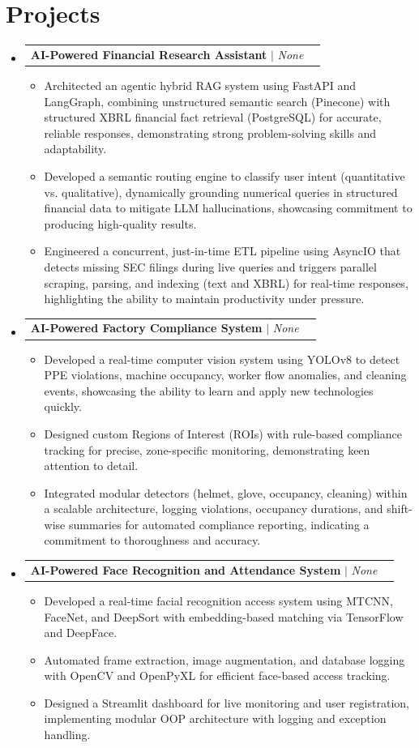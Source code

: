 \documentclass[letterpaper,11pt]{article}
\makeatletter
\newcommand{\resumeItem}[1]{
  \item\small{
    {#1 \vspace{-2pt}}
  }
}
\newcommand{\resumeProjectHeading}[2]{
    \item
    \begin{tabular*}{0.97\textwidth}{l@{\extracolsep{\fill}}r}
      \small#1 & #2 \\
    \end{tabular*}\vspace{-7pt}
}
\newcommand{\resumeSubHeadingListStart}{\begin{itemize}[leftmargin=0.15in, label={}]}
\newcommand{\resumeSubHeadingListEnd}{\end{itemize}}
\newcommand{\resumeItemListStart}{\begin{itemize}}
\newcommand{\resumeItemListEnd}{\end{itemize}\vspace{-5pt}}
\makeatother
\begin{document}
\section{Projects}
    \resumeSubHeadingListStart
            \resumeProjectHeading
          {\textbf{AI-Powered Financial Research Assistant} $|$ \emph{None}}{}
          \resumeItemListStart
                        \resumeItem{Architected an agentic hybrid RAG system using FastAPI and LangGraph, combining unstructured semantic search (Pinecone) with structured XBRL financial fact retrieval (PostgreSQL) for accurate, reliable responses, demonstrating strong problem-solving skills and adaptability.}
                        \resumeItem{Developed a semantic routing engine to classify user intent (quantitative vs. qualitative), dynamically grounding numerical queries in structured financial data to mitigate LLM hallucinations, showcasing commitment to producing high-quality results.}
                        \resumeItem{Engineered a concurrent, just-in-time ETL pipeline using AsyncIO that detects missing SEC filings during live queries and triggers parallel scraping, parsing, and indexing (text and XBRL) for real-time responses, highlighting the ability to maintain productivity under pressure.}
                      \resumeItemListEnd
            \resumeProjectHeading
          {\textbf{AI-Powered Factory Compliance System} $|$ \emph{None}}{}
          \resumeItemListStart
                        \resumeItem{Developed a real-time computer vision system using YOLOv8 to detect PPE violations, machine occupancy, worker flow anomalies, and cleaning events, showcasing the ability to learn and apply new technologies quickly.}
                        \resumeItem{Designed custom Regions of Interest (ROIs) with rule-based compliance tracking for precise, zone-specific monitoring, demonstrating keen attention to detail.}
                        \resumeItem{Integrated modular detectors (helmet, glove, occupancy, cleaning) within a scalable architecture, logging violations, occupancy durations, and shift-wise summaries for automated compliance reporting, indicating a commitment to thoroughness and accuracy.}
                      \resumeItemListEnd
            \resumeProjectHeading
          {\textbf{AI-Powered Face Recognition and Attendance System} $|$ \emph{None}}{}
          \resumeItemListStart
                        \resumeItem{Developed a real-time facial recognition access system using MTCNN, FaceNet, and DeepSort with embedding-based matching via TensorFlow and DeepFace.}
                        \resumeItem{Automated frame extraction, image augmentation, and database logging with OpenCV and OpenPyXL for efficient face-based access tracking.}
                        \resumeItem{Designed a Streamlit dashboard for live monitoring and user registration, implementing modular OOP architecture with logging and exception handling.}
                      \resumeItemListEnd
          \resumeSubHeadingListEnd
\end{document}
